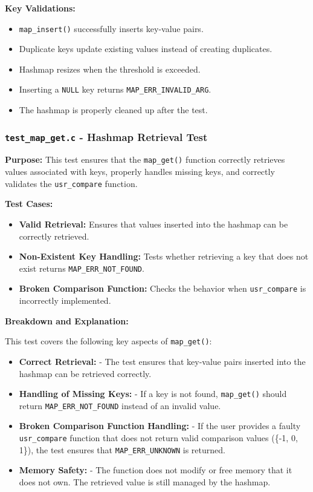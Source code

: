 \documentclass[titlepage]{article}
\begin{document}
\textbf{Key Validations:}
\begin{itemize}
    \item \texttt{map\_insert()} successfully inserts key-value pairs.
    \item Duplicate keys update existing values instead of creating duplicates.
    \item Hashmap resizes when the threshold is exceeded.
    \item Inserting a \texttt{NULL} key returns \texttt{MAP\_ERR\_INVALID\_ARG}.
    \item The hashmap is properly cleaned up after the test.
\end{itemize}


\subsubsection{\texttt{test\_map\_get.c} - Hashmap Retrieval Test}

\textbf{Purpose:}
This test ensures that the \texttt{map\_get()} function correctly retrieves values associated with keys, properly handles missing keys, and correctly validates the \texttt{usr\_compare} function.

\textbf{Test Cases:}
\begin{itemize}
    \item \textbf{Valid Retrieval:} Ensures that values inserted into the hashmap can be correctly retrieved.
    \item \textbf{Non-Existent Key Handling:} Tests whether retrieving a key that does not exist returns \texttt{MAP\_ERR\_NOT\_FOUND}.
    \item \textbf{Broken Comparison Function:} Checks the behavior when \texttt{usr\_compare} is incorrectly implemented.
\end{itemize}

\textbf{Breakdown and Explanation:}

This test covers the following key aspects of \texttt{map\_get()}:

\begin{itemize}
    \item \textbf{Correct Retrieval:}
    - The test ensures that key-value pairs inserted into the hashmap can be retrieved correctly.

    \item \textbf{Handling of Missing Keys:}
    - If a key is not found, \texttt{map\_get()} should return \texttt{MAP\_ERR\_NOT\_FOUND} instead of an invalid value.

    \item \textbf{Broken Comparison Function Handling:}
    - If the user provides a faulty \texttt{usr\_compare} function that does not return valid comparison values (\{-1, 0, 1\}), the test ensures that \texttt{MAP\_ERR\_UNKNOWN} is returned.

    \item \textbf{Memory Safety:}
    - The function does not modify or free memory that it does not own. The retrieved value is still managed by the hashmap.
\end{itemize}
\end{document}
